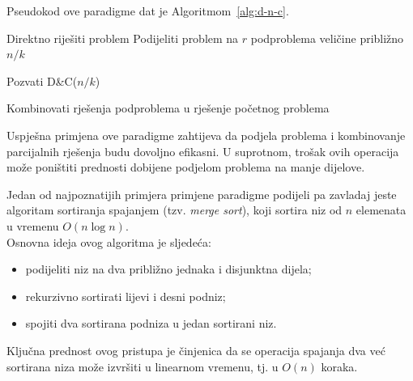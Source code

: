 Pseudokod ove paradigme dat je Algoritmom~\ref{alg:d-n-c}.

\begin{algorithm}
	\begin{algorithmic}[1]
		
		\State Direktno riješiti problem
		\Else
		\State Podijeliti problem na $r$ podproblema veličine približno $n/k$
		
		\State Pozvati \textsc{D\&C}($n/k$)
		\EndFor
		
		\State Kombinovati rješenja podproblema u rješenje početnog problema
		
		\EndIf
		
		\EndProcedure
	\end{algorithmic}
	\caption{Paradigma Podijeli pa zavladaj.}
	\label{alg:d-n-c}
\end{algorithm}

Uspješna primjena ove paradigme zahtijeva da podjela problema i kombinovanje parcijalnih rješenja budu dovoljno efikasni. U suprotnom, trošak ovih operacija može poništiti prednosti dobijene podjelom problema na manje dijelove.

Jedan od najpoznatijih primjera primjene paradigme podijeli pa zavladaj jeste algoritam sortiranja spajanjem (tzv. \emph{merge sort}), koji sortira niz od $n$ elemenata u vremenu $O(n \log n)$.\\ 

Osnovna ideja ovog algoritma je sljedeća:

\begin{itemize}
	\item podijeliti niz na dva približno jednaka i disjunktna dijela;
	\item rekurzivno sortirati lijevi i desni podniz;
	\item spojiti dva sortirana podniza u jedan sortirani niz.
\end{itemize}

Ključna prednost ovog pristupa je činjenica da se operacija spajanja dva već sortirana niza može izvršiti u linearnom vremenu, tj. u $O(n)$ koraka.


